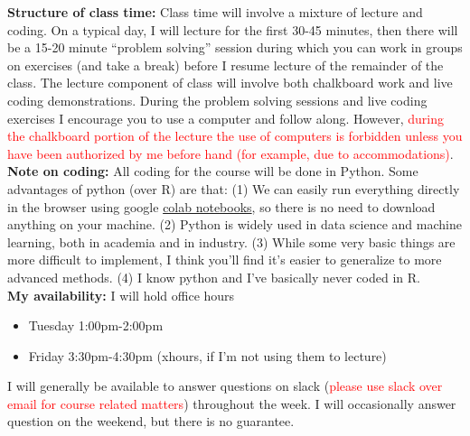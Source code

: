 \noindent
{\bf Structure of class time:} Class time will involve a mixture of lecture and coding. On a typical day, I will lecture for the first 30-45 minutes, then there will be a 15-20 minute ``problem solving''  session during which you can work in groups on exercises (and take a break) before I resume lecture of the remainder of the class. The lecture component of class will involve both chalkboard work and live coding demonstrations. During the problem solving sessions and live coding exercises I encourage you to use a computer and follow along. However, \textcolor{red}{during the chalkboard portion of the lecture the use of computers is forbidden unless you have been authorized by me before hand (for example, due to accommodations)}.\\



\noindent
{\bf Note on coding:}
All coding for the course will be done in Python. Some advantages of python (over R) are that: (1) We can easily run everything directly in the browser using google \href{https://colab.research.google.com/}{colab notebooks}, so there is no need to download anything on your machine. (2) Python is widely used in data science and machine learning, both in academia and in industry. (3) While some very basic things are more difficult to implement, I think you’ll find it’s easier to generalize to more advanced methods. (4) I know python and I’ve basically never coded in R.\\


\noindent
{\bf My availability:} I will hold office hours 
\begin{itemize}
\item Tuesday 1:00pm-2:00pm
\item Friday 3:30pm-4:30pm  (xhours, if I'm not using them to lecture) 
\end{itemize}
I will generally be available to answer questions on slack (\textcolor{red}{please use slack over email for course related matters}) throughout the week. I will occasionally answer question on the weekend, but there is no guarantee.  \\



